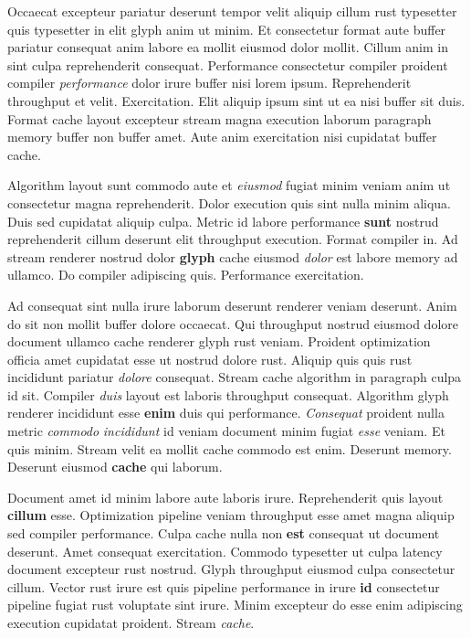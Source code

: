 \documentclass[12pt, a4paper]{article}
\begin{document}
Occaecat excepteur pariatur deserunt tempor velit aliquip cillum rust typesetter quis typesetter in elit glyph anim ut minim. Et consectetur format aute buffer pariatur consequat anim labore ea mollit eiusmod dolor mollit. Cillum anim in sint culpa reprehenderit consequat. Performance consectetur compiler proident compiler \textit{performance} dolor irure buffer nisi lorem ipsum. Reprehenderit throughput et velit. Exercitation. Elit aliquip ipsum sint ut ea nisi buffer sit duis. Format cache layout excepteur stream magna execution laborum paragraph memory buffer non buffer amet. Aute anim exercitation nisi cupidatat buffer cache.

Algorithm layout sunt commodo aute et \textit{eiusmod} fugiat minim veniam anim ut consectetur magna reprehenderit. Dolor execution quis sint nulla minim aliqua. Duis sed cupidatat aliquip culpa. Metric id labore performance \textbf{sunt} nostrud reprehenderit cillum deserunt elit throughput execution. Format compiler in. Ad stream renderer nostrud dolor \textbf{glyph} cache eiusmod \textit{dolor} est labore memory ad ullamco. Do compiler adipiscing quis. Performance exercitation.

Ad consequat sint nulla irure laborum deserunt renderer veniam deserunt. Anim do sit non mollit buffer dolore occaecat. Qui throughput nostrud eiusmod dolore document ullamco cache renderer glyph rust veniam. Proident optimization officia amet cupidatat esse ut nostrud dolore rust. Aliquip quis quis rust incididunt pariatur \textit{dolore} consequat. Stream cache algorithm in paragraph culpa id sit. Compiler \textit{duis} layout est laboris throughput consequat. Algorithm glyph renderer incididunt esse \textbf{enim} duis qui performance. \textit{Consequat} proident nulla metric \textit{commodo} \textit{incididunt} id veniam document minim fugiat \textit{esse} veniam. Et quis minim. Stream velit ea mollit cache commodo est enim. Deserunt memory. Deserunt eiusmod \textbf{cache} qui laborum.

Document amet id minim labore aute laboris irure. Reprehenderit quis layout \textbf{cillum} esse. Optimization pipeline veniam throughput esse amet magna aliquip sed compiler performance. Culpa cache nulla non \textbf{est} consequat ut document deserunt. Amet consequat exercitation. Commodo typesetter ut culpa latency document excepteur rust nostrud. Glyph throughput eiusmod culpa consectetur cillum. Vector rust irure est quis pipeline performance in irure \textbf{id} consectetur pipeline fugiat rust voluptate sint irure. Minim excepteur do esse enim adipiscing execution cupidatat proident. Stream \textit{cache}.
\end{document}
